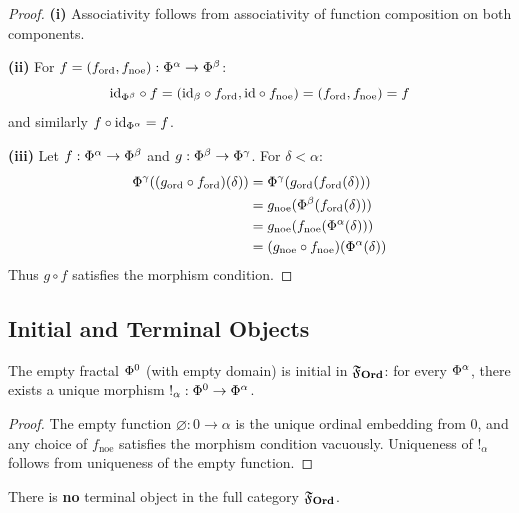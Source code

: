 \begin{proof}
\textbf{(i)} Associativity follows from associativity of function composition on both components.

\textbf{(ii)} For $f = (f_\mathrm{ord}, f_\mathrm{noe}) : \Phi^{\alpha} \to \Phi^{\beta}$:
\[
\mathrm{id}_{\Phi^{\beta}} \circ f = (\mathrm{id}_\beta \circ f_\mathrm{ord}, \mathrm{id} \circ f_\mathrm{noe}) = (f_\mathrm{ord}, f_\mathrm{noe}) = f
\]
and similarly $f \circ \mathrm{id}_{\Phi^{\alpha}} = f$.

\textbf{(iii)} Let $f : \Phi^{\alpha} \to \Phi^{\beta}$ and $g : \Phi^{\beta} \to \Phi^{\gamma}$. For $\delta < \alpha$:
\begin{align*}
\Phi^{\gamma}((g_\mathrm{ord} \circ f_\mathrm{ord})(\delta))
&= \Phi^{\gamma}(g_\mathrm{ord}(f_\mathrm{ord}(\delta))) \\
&= g_\mathrm{noe}(\Phi^{\beta}(f_\mathrm{ord}(\delta))) \\
&= g_\mathrm{noe}(f_\mathrm{noe}(\Phi^{\alpha}(\delta))) \\
&= (g_\mathrm{noe} \circ f_\mathrm{noe})(\Phi^{\alpha}(\delta))
\end{align*}
Thus $g \circ f$ satisfies the morphism condition.
\end{proof}

\subsection{Initial and Terminal Objects}

\begin{proposition}
\label{prop:initial-object}
The empty fractal $\Phi^{0}$ (with empty domain) is initial in $\mathfrak{F}_{\mathbf{Ord}}$: for every $\Phi^{\alpha}$, there exists a unique morphism $!_\alpha : \Phi^{0} \to \Phi^{\alpha}$.
\end{proposition}

\begin{proof}
The empty function $\varnothing : 0 \to \alpha$ is the unique ordinal embedding from $0$, and any choice of $f_\mathrm{noe}$ satisfies the morphism condition vacuously. Uniqueness of $!_\alpha$ follows from uniqueness of the empty function.
\end{proof}

\begin{proposition}
\label{prop:terminal-object}
There is \textbf{no} terminal object in the full category $\mathfrak{F}_{\mathbf{Ord}}$.
\end{proposition}

